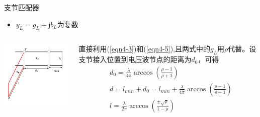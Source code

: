 \begin{frame}{支节匹配器}
  \begin{itemize}
    \item $y_L=g_L+\mathrm{j}b_L$为复数
  \end{itemize}
  \begin{columns}
    \begin{column}{0.5\linewidth}
      \includegraphics[width=6cm]{fig4-28true.pdf}
    \end{column}
    \begin{column}{0.5\linewidth}
      直接利用(\ref{eqn4-3})和(\ref{eqn4-5}),且两式中的$g_L$用$\rho$代替。设支节接入位置到电压波节点的距离为$d_0$，可得
      \begin{align*}
        &d_0=\frac{\lambda}{4\pi}\arccos\left(\frac{\rho-1}{\rho+1}\right)\\
        &d=l_{min}+d_0=l_{min}+\frac{\lambda}{4\pi}\arccos\left(\frac{\rho-1}{\rho+1}\right)\\
        &l=\frac{\lambda}{2\pi}\arccos\left(\frac{\pm\sqrt{\rho}}{1-\rho}\right)
      \end{align*}
    \end{column}
  \end{columns}
\end{frame}

